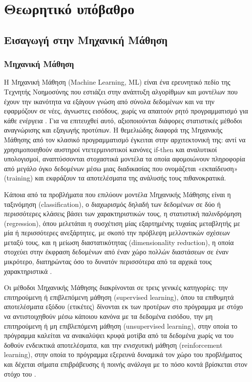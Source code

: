 \chapter{Θεωρητικό υπόβαθρο}\label{ch:theory}

\section{Εισαγωγή στην Μηχανική Μάθηση}\label{sec:ml}
\subsection{Μηχανική Μάθηση}\label{ssec:ml-def}
Η Μηχανική Μάθηση (Machine Learning, ML) είναι ένα ερευνητικό πεδίο της Τεχνητής Νοημοσύνης που εστιάζει στην ανάπτυξη αλγορίθμων και μοντέλων που έχουν την ικανότητα να εξάγουν γνώση από σύνολα δεδομένων και να την εφαρμόζουν σε νέες, άγνωστες εισόδους, χωρίς να απαιτούν ρητό προγραμματισμό για κάθε ενέργεια \cite{mitchell_machine_1997, flach_machine_2012}. Για να επιτευχθεί αυτό, αξιοποιούνται διάφορες στατιστικές μέθοδοι αναγνώρισης και εξαγωγής προτύπων. Η θεμελιώδης διαφορά της Μηχανικής Μάθησης από τον κλασικό προγραμματισμό έγκειται στην αρχιτεκτονική της: αντί να χρησιμοποιηθούν αυστηροί ντετερμινιστικοί κανόνες if-then και αναλυτικοί υπολογισμοί, αναπτύσσονται στοχαστικά μοντέλα τα οποία αφομοιώνουν πληροφορία από μεγάλο όγκο δεδομένων μέσω μιας διαδικασίας που ονομάζεται «εκπαίδευση» (training) και εκφράζουν τα αποτελέσματα της ανάλυσής τους πιθανοκρατικά.

Κάποια από τα προβλήματα που επιλύουν μοντέλα Μηχανικής Μάθησης είναι η ταξινόμηση (classification), ο διαχωρισμός δηλαδή των δεδομένων σε δύο ή περισσότερες κλάσεις βάσει των χαρακτηριστικών τους, η στατιστική παλινδρόμηση (regression), όπου μελετάται η συσχέτιση μίας εξαρτημένης τυχαίας μεταβλητής με μία ή περισσότερες ανεξάρτητες, με σκοπό την πρόβλεψη μελλοντικών σχέσεων μεταξύ τους, και η μείωση διαστατικότητας (dimensionality reduction), η οποία στοχεύει στην έκφραση δεδομένων από έναν χώρο πολλών διαστάσεων σε έναν μικρότερο, διατηρώντας όσο το δυνατόν περισσότερα από τα αρχικά τους χαρακτηριστικά \cite{bishop_pattern_2006, michie_machine_1995}.

Οι μέθοδοι Μηχανικής Μάθησης διακρίνονται σε τρεις γενικές κατηγορίες: την επιτηρούμενη ή επιβλεπόμενη μάθηση (supervised learning), όπου τα επιθυμητά αποτελέσματα εξόδου (ετικέτες) δίνονται εκ των προτέρων στο πρόγραμμα με στόχο να αντιστοιχηθούν μέσω κάποιου κανόνα με τα δεδομένα εισόδου, την μη επιτηρούμενη ή μη επιβλεπόμενη μάθηση (unsupervised learning), στην οποία το πρόγραμμα καλείται να ανακαλύψει κρυφά μοτίβα από τα δεδομένα χωρίς να του δοθούν ενδεικτικά αποτελέσματα, και την ενισχυτική μάθηση (reinforcement learning), στην οποία το πρόγραμμα εξερευνά δυναμικά τον χώρο του προβλήματος και δέχεται σήματα επιβράβευσης ή ποινής ανάλογα με το πόσο κοντά βρίσκεται στον στόχο του \cite{mitchell_machine_1997, bishop_pattern_2006}.

